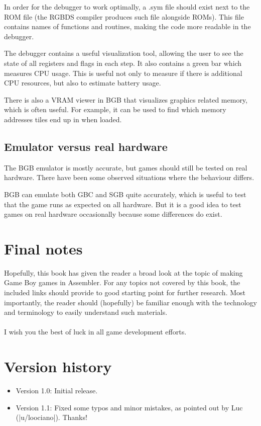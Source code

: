 \documentclass[11pt]{book}
\begin{document}
In order for the debugger to work optimally, a .sym file should exist next to the ROM file (the RGBDS compiler produces such file alongside ROMs). This file contains names of functions and routines, making the code more readable in the debugger.

The debugger contains a useful visualization tool, allowing the user to see the state of all registers and flags in each step. It also contains a green bar which measures CPU usage. This is useful not only to measure if there is additional CPU resources, but also to estimate battery usage.

There is also a VRAM viewer in BGB that visualizes graphics related memory, which is often useful. For example, it can be used to find which memory addresses tiles end up in when loaded.

\section{Emulator versus real hardware} 
The BGB emulator is mostly accurate, but games should still be tested on real hardware. There have been some observed situations where the behaviour differs. 

BGB can emulate both GBC and SGB quite accurately, which is useful to test that the game runs as expected on all hardware. But it is a good idea to test games on real hardware occasionally because some differences do exist.

\chapter{Final notes}
Hopefully, this book has given the reader a broad look at the topic of making Game Boy games in Assembler. For any topics not covered by this book, the included links should provide to good starting point for further research. Most importantly, the reader should (hopefully) be familiar enough with the technology and terminology to easily understand such materials.
~\\
~\\
\noindent I wish you the best of luck in all game development efforts. 

\chapter{Version history}
\begin{itemize}
\item Version 1.0: Initial release.
\item Version 1.1: Fixed some typos and minor mistakes, as pointed out by Luc (|u/loociano|). Thanks!
\end{itemize}
\end{document}
